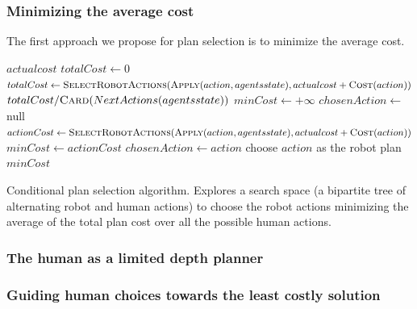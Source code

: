 \documentclass[a4paper,11pt,twoside]{StyleThese}
\begin{document}
\subsubsection{Minimizing the average cost}
The first approach we propose for plan selection is to minimize the average cost.

\begin{algorithm}[H]
\begin{algorithmic}[1]
	\State \Return $actualcost$
\EndIf
{}
	\State $totalCost \leftarrow 0$
		\State $totalCost \leftarrow \textsc{SelectRobotActions}(\textsc{Apply}(action, agentsstate), actualcost + \textsc{Cost}(action))$
	\EndFor
	\Return $totalCost / \textsc{Card}(NextActions(agentsstate))$
\Else
	\State $minCost \leftarrow +\infty$
	\State $chosenAction \leftarrow$ null
		\State $actionCost \leftarrow \textsc{SelectRobotActions}(\textsc{Apply}(action, agentsstate), actualcost + \textsc{Cost}(action))$
			\State $minCost \leftarrow actionCost$
			\State $chosenAction \leftarrow action$
		\EndIf
	\EndFor
	\State choose $action$ as the robot plan
	\Return $minCost$	
\EndIf
\EndFunction
	
\end{algorithmic}
 \caption{Conditional plan selection algorithm. Explores a search space (a bipartite tree of alternating robot and human actions) to choose the robot actions minimizing the average of the total plan cost over all the possible human actions.}
 \label{alg:minaverage}
\end{algorithm}


\subsubsection{The human as a limited depth planner}

\subsubsection{Guiding human choices towards the least costly solution}
\end{document}
